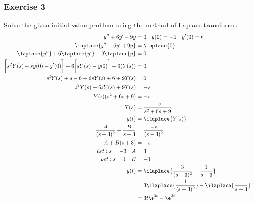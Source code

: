\documentclass{math}
\begin{document}
\subsubsection*{Exercise 3}
Solve the given initial value problem using the method of Laplace transforms.
\begin{align*}
  y''+6y'+9y &= 0 \quad y(0) = -1 \quad y'(0) = 6 \\
  \laplace{y''+6y'+9y} &= \laplace{0} \\
  \laplace{y''}+6\laplace{y'}+9\laplace{y} &= 0 \\
  \bigg[s^2Y(s)-sy(0)-y'(0)\bigg]+6\bigg[sY(s)-y(0)\bigg]+9(Y(s)) &= 0 \\
  s^2Y(s)+s-6+6sY(s)+6+9Y(s) &= 0 \\
  s^2Y(s)+6sY(s)+9Y(s) &= -s \\
  Y(s)(s^2+6s+9) &= -s \\
  Y(s) &= \frac{-s}{s^2+6s+9} \\
  y(t) &= \ilaplace{Y(s)} \\
  \frac{A}{(s+3)^2}+\frac{B}{s+3} &= \frac{-s}{(s+3)^2} \\
  A+B(s+3) &= -s \\
  Let: s = -3 \quad A &= 3 \\
  Let: s = 1 \quad B &= -1 \\
  y(t) &= \ilaplace{\frac{3}{(s+3)^2}-\frac{1}{s+3}} \\
  &= 3\ilaplace{\frac{1}{(s+3)^2}}-\ilaplace{\frac{1}{s+3}} \\
  &= 3t\e^{3t}-\e^{3t}
\end{align*}
\end{document}

